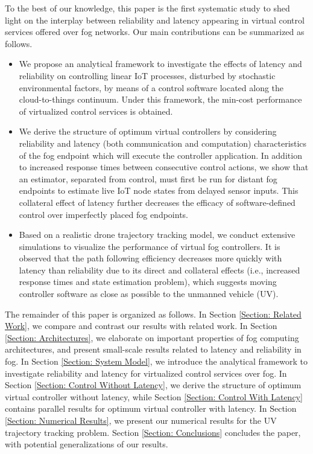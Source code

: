 \documentclass[10pt, journal, letterpaper]{IEEEtran}
\newcommand{\1}{\ensuremath{\mathbf{1}}} %
\begin{document}
To the best of our knowledge, this paper is the first systematic study to shed light on the interplay between reliability and latency appearing in virtual control services offered over fog networks. Our main contributions can be summarized as follows.
\begin{itemize}
\item We propose an analytical framework to investigate the effects of latency and reliability on controlling linear IoT processes, disturbed by stochastic environmental factors, by means of a control software located along the cloud-to-things continuum. Under this framework, the min-cost performance of virtualized control services is obtained.
\item We derive the structure of optimum virtual controllers by considering reliability and latency (both communication and computation) characteristics of the fog endpoint which will execute the controller application. In addition to increased response times between consecutive control actions, we show that an estimator, separated from control, must first be run for distant fog endpoints to estimate live IoT node states from delayed sensor inputs. This collateral effect of latency further decreases the efficacy of software-defined control over imperfectly placed fog endpoints.
\item Based on a realistic drone trajectory tracking model, we conduct extensive simulations to visualize the performance of virtual fog controllers. It is observed that the path following efficiency decreases more quickly with latency than reliability due to its direct and collateral effects (i.e., increased response times and state estimation problem), which suggests moving controller software as close as possible to the unmanned vehicle (UV).
\end{itemize}

The remainder of this paper is organized as follows. In Section \ref{Section: Related Work}, we compare and contrast our results with related work.  In Section \ref{Section: Architectures}, we elaborate on important properties of fog computing architectures, and present small-scale results related to latency and reliability in fog.  In Section \ref{Section: System Model}, we introduce the analytical framework to investigate reliability and latency for virtualized control services over fog. In Section \ref{Section: Control Without Latency}, we derive the structure of optimum virtual controller without latency, while Section \ref{Section: Control With Latency} contains parallel results for optimum virtual controller with latency. In Section \ref{Section: Numerical Results}, we present our numerical results for the UV trajectory tracking problem. Section \ref{Section: Conclusions} concludes the paper, with potential generalizations of our results. %
\end{document}
